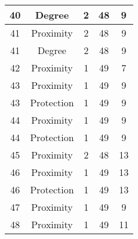 \documentclass[results.tex]{subfiles}
\begin{document}
\begin{center}
\begin{tabular}{| c || c | c | c | c |}
            \hline
            40                      & Degree                       & 2                      & 48                      & 9                    \\
            \hline
            41                      & Proximity                    & 2                      & 48                      & 9                    \\
            \hline
            41                      & Degree                       & 2                      & 48                      & 9                    \\
            \hline
            42                      & Proximity                    & 1                      & 49                      & 7                    \\
            \hline
            43                      & Proximity                    & 1                      & 49                      & 9                    \\
            \hline
            43                      & Protection                   & 1                      & 49                      & 9                    \\
            \hline
            44                      & Proximity                    & 1                      & 49                      & 9                    \\
            \hline
            44                      & Protection                   & 1                      & 49                      & 9                    \\
            \hline
            45                      & Proximity                    & 2                      & 48                      & 13                   \\
            \hline
            46                      & Proximity                    & 1                      & 49                      & 13                   \\
            \hline
            46                      & Protection                   & 1                      & 49                      & 13                   \\
            \hline
            47                      & Proximity                    & 1                      & 49                      & 9                    \\
            \hline
            48                      & Proximity                    & 1                      & 49                      & 11                   \\

\end{tabular}
\end{center}
\end{document}
